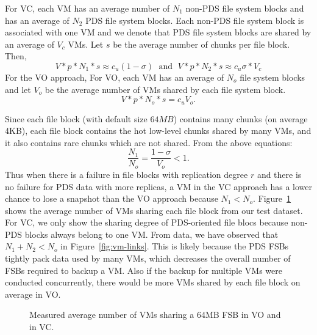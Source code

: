 For VC, each VM has an average number of $N_1$ non-PDS file system blocks
and  has  an average of  $N_2$ PDS file system blocks. 
Each non-PDS file system block is associated with one VM
 and  we denote that PDS file system blocks are
shared by an average of $V_c$ VMs. Let $s$ be the average number of chunks per file block. Then, 
\[
V *p*N_1 *s  \approx c_u (1-\sigma)\; \mbox{ and } \; 
V *p*N_2 *s  \approx c_u \sigma *V_c
\]
For the VO approach, 
For VO, each VM has an average of $N_o$ file system blocks
and let $V_o$ be the average number of VMs shared by each file system block.
\[
V *p*N_o *s  = c_u  V_o.
\]

Since each file block (with default size $64MB$) contains many chunks (on average 4KB),
each file block contains the hot low-level chunks shared by many VMs, and it also contains
rare chunks which are not shared.  From the above equations:
\[
\frac{N_1}{N_o}=  \frac{1-\sigma}{V_o}<1.
\] 
Thus when there is a failure in file blocks with replication degree $r$
and there is no failure for PDS data with more replicas,   a VM in
the VC approach has a lower chance to lose a snapshot than the VO approach because
$N_1<N_o$. 
Figure~\ref{fig:fsb-links} shows the average number of VMs sharing each file block from
our test dataset.
For VC, we only show
the sharing degree of  PDS-oriented file blocs  because non-PDS blocks always belong to
one VM.
From data, 
we have observed that $N_1 +N_2 < N_o$ in Figure~\ref{fig:vm-links}. 
This is likely because the PDS FSBs tightly pack data used by many VMs, 
which decreases the overall number of FSBs required to backup a VM.
Also if  the backup for multiple VMs were conducted concurrently, there would be more
VMs shared  by each file block on average in VO. 

\begin{figure}[htbp]
  \centering
  \caption{Measured average number of VMs sharing a 64MB FSB in VO and in VC.}
  \label{fig:fsb-links}
\end{figure}

